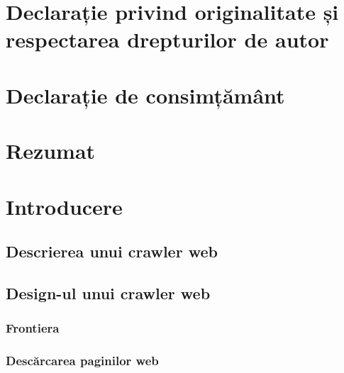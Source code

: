\documentclass[12pt,oneside]{report}
\newcommand{\chaptertitle}[1]{\LARGE{#1}}
\begin{document}

\chapter*{
	\large{
		Declarație privind originalitate și respectarea drepturilor de autor
	}
}



\chapter*{
	\large{
		Declarație de consimțământ
	}
}



\chapter*{\chaptertitle{Rezumat}}

\newpage



\tableofcontents
\clearpage

\chapter*{\chaptertitle{Introducere}}

\clearpage

\section{Descrierea unui crawler web}


\section{Design-ul unui crawler web}


\subsection{Frontiera}


\subsection{Descărcarea paginilor web}

\end{document}
